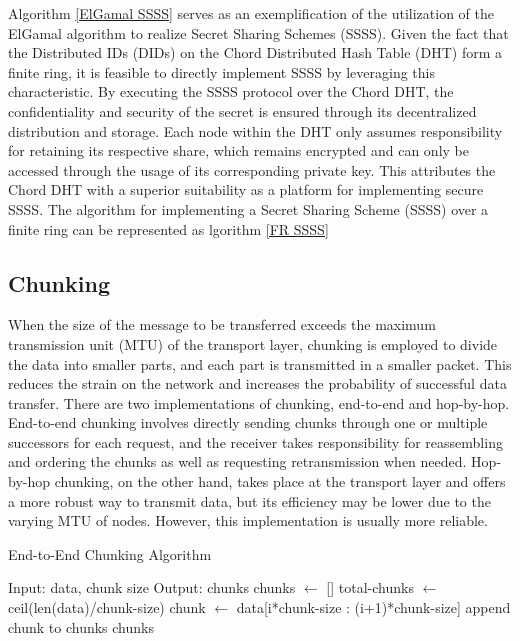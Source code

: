\documentclass[twocolumn]{article}
\begin{document}
 Algorithm \ref{ElGamal SSSS} serves as an exemplification of the utilization of the ElGamal algorithm to realize Secret Sharing Schemes (SSSS). Given the fact that the Distributed IDs (DIDs) on the Chord Distributed Hash Table (DHT) form a finite ring, it is feasible to directly implement SSSS by leveraging this characteristic. By executing the SSSS protocol over the Chord DHT, the confidentiality and security of the secret is ensured through its decentralized distribution and storage. Each node within the DHT only assumes responsibility for retaining its respective share, which remains encrypted and can only be accessed through the usage of its corresponding private key. This attributes the Chord DHT with a superior suitability as a platform for implementing secure SSSS. The algorithm for implementing a Secret Sharing Scheme (SSSS) over a finite ring can be represented as lgorithm \ref{FR SSSS}

 \subsection{Chunking}

 When the size of the message to be transferred exceeds the maximum transmission unit (MTU) of the transport layer, chunking is employed to divide the data into smaller parts, and each part is transmitted in a smaller packet. This reduces the strain on the network and increases the probability of successful data transfer. There are two implementations of chunking, end-to-end and hop-by-hop. End-to-end chunking involves directly sending chunks through one or multiple successors for each request, and the receiver takes responsibility for reassembling and ordering the chunks as well as requesting retransmission when needed. Hop-by-hop chunking, on the other hand, takes place at the transport layer and offers a more robust way to transmit data, but its efficiency may be lower due to the varying MTU of nodes. However, this implementation is usually more reliable.

 \begin{algorithm}[h]
\caption{End-to-End Chunking Algorithm}
\label{alg:e2e_chunking}
\begin{algorithmic}[1]
\State Input: data, chunk size
\State Output: chunks
\State chunks $\gets$ []
\State total-chunks $\gets$ ceil(len(data)/chunk-size)
\State chunk $\gets$ data[i*chunk-size : (i+1)*chunk-size]
\State append chunk to chunks
\EndFor
\State \Return chunks
\EndProcedure
\end{algorithmic}
\end{algorithm}
\end{document}
